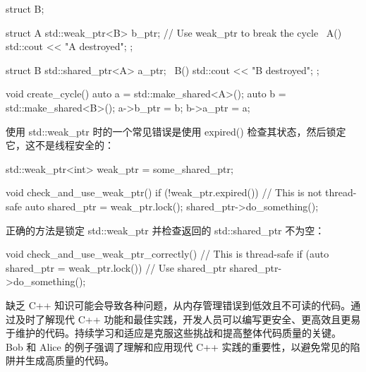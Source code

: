 \begin{cpp}
struct B;

struct A {
    std::weak_ptr<B> b_ptr; // Use weak_ptr to break the cycle
    ~A() { std::cout << "A destroyed\n"; }
};

struct B {
    std::shared_ptr<A> a_ptr;
    ~B() { std::cout << "B destroyed\n"; }
};

void create_cycle() {
    auto a = std::make_shared<A>();
    auto b = std::make_shared<B>();
    a->b_ptr = b;
    b->a_ptr = a;
}
\end{cpp}


使用 std::weak\_ptr 时的一个常见错误是使用 expired() 检查其状态，然后锁定它，这不是线程安全的：

\begin{cpp}
std::weak_ptr<int> weak_ptr = some_shared_ptr;

void check_and_use_weak_ptr() {
    if (!weak_ptr.expired()) {
        // This is not thread-safe
        auto shared_ptr = weak_ptr.lock();
        shared_ptr->do_something();
    }
}
\end{cpp}

正确的方法是锁定 std::weak\_ptr 并检查返回的 std::shared\_ptr 不为空：

\begin{cpp}
void check_and_use_weak_ptr_correctly() {
    // This is thread-safe
    if (auto shared_ptr = weak_ptr.lock()) {
        // Use shared_ptr
        shared_ptr->do_something();
    }
}
\end{cpp}

缺乏 C++ 知识可能会导致各种问题，从内存管理错误到低效且不可读的代码。通过及时了解现代 C++ 功能和最佳实践，开发人员可以编写更安全、更高效且更易于维护的代码。持续学习和适应是克服这些挑战和提高整体代码质量的关键。 Bob 和 Alice 的例子强调了理解和应用现代 C++ 实践的重要性，以避免常见的陷阱并生成高质量的代码。




